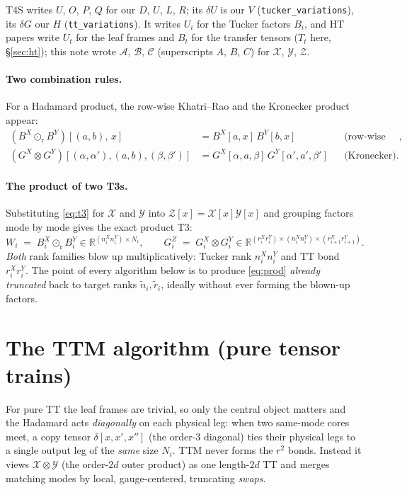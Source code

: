 \documentclass[11pt]{article}
\newcommand{\X}{\mathcal{X}}
\newcommand{\Y}{\mathcal{Y}}
\newcommand{\Z}{\mathcal{Z}}
\newcommand{\R}{\mathbb{R}}
\newcommand{\krrow}{\odot_{\mathrm{r}}}     %
\newcommand{\kron}{\otimes}
\newcommand{\rtil}{\tilde{r}}
\newcommand{\ntil}{\tilde{n}}
\begin{document}
T4S writes $U$, $O$, $P$, $Q$ for our $D$, $U$, $L$, $R$; its $\delta U$ is our $V$
(\texttt{tucker\_variations}), its $\delta G$ our $H$ (\texttt{tt\_variations}). It writes $U_i$ for the
Tucker factors $B_i$, and HT papers write $U_t$ for the leaf frames and $B_t$ for the transfer tensors
($T_t$ here, \S\ref{sec:ht}); this note wrote $\mathcal A$, $\mathcal B$, $\mathcal C$ (superscripts $A$, $B$, $C$)
for $\X$, $\Y$, $\Z$.

\paragraph{Two combination rules.}
For a Hadamard product, the row-wise Khatri--Rao and the Kronecker product appear:
\begin{align}
(B^X\krrow B^Y)[(a,b),\,x] &= B^X[a,x]\,B^Y[b,x] && \text{(row-wise Khatri--Rao, ``COPY'')},\\
(G^X\kron G^Y)[(\alpha,\alpha'),(a,b),(\beta,\beta')] &= G^X[\alpha,a,\beta]\,G^Y[\alpha',a',\beta'] && \text{(Kronecker)} .
\end{align}

\paragraph{The product of two T3s.}
Substituting \eqref{eq:t3} for $\X$ and $\Y$ into $\Z[x]=\X[x]\Y[x]$ and grouping
factors mode by mode gives the exact product T3:
\begin{equation}
W_i \;=\; B^X_i\krrow B^Y_i \in\R^{(n^X_i n^Y_i)\times N_i},
\qquad
G^Z_i \;=\; G^X_i\kron G^Y_i \in\R^{(r^X_i r^Y_i)\times(n^X_i n^Y_i)\times(r^X_{i+1}r^Y_{i+1})}.
\label{eq:prod}
\end{equation}
\emph{Both} rank families blow up multiplicatively: Tucker rank
$n^X_i n^Y_i$ and TT bond $r^X_i r^Y_i$. The point of every algorithm below is to
produce \eqref{eq:prod} \emph{already truncated} back to target ranks
$\ntil_i,\rtil_i$, ideally without ever forming the blown-up factors.

\section{The TTM algorithm (pure tensor trains)}
\label{sec:ttm}

For pure TT the leaf frames are trivial, so only the central object matters and
the Hadamard acts \emph{diagonally} on each physical leg: when two same-mode cores
meet, a copy tensor $\delta[x,x',x'']$ (the order-3 diagonal) ties their physical
legs to a single output leg of the \emph{same} size $N_i$. TTM never forms the
$r^2$ bonds. Instead it views $\X\kron\Y$ (the order-$2d$ outer product) as one
length-$2d$ TT and merges matching modes by local, gauge-centered, truncating
\emph{swaps}.
\end{document}
